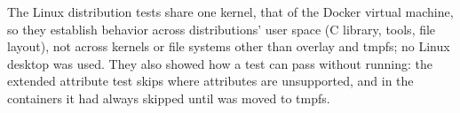 The Linux distribution tests share one kernel, that of the Docker virtual machine, so
they establish behavior across distributions' user space (C library, tools, file
layout), not across kernels or file systems other than overlay and tmpfs; no Linux
desktop was used.  They also showed how a test can pass without running: the extended
attribute test skips where attributes are unsupported, and in the containers it had
always skipped until  was moved to tmpfs.
